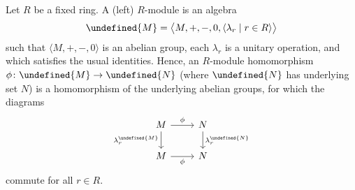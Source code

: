 \documentclass[article, a4paper, 11pt, oneside]{memoir}
\let\mathfrak\undefined
\numberwithin{equation}{chapter}
\theoremstyle{nonumberplain}
\begin{document}
\begin{remarkbreak}
    Let $R$ be a fixed ring. A (left) $R$-module is an algebra
    \begin{equation*}
        \mathfrak{M} = \bigl\langle M, +, -, 0, \langle \lambda_r \mid r \in R \rangle \bigr\rangle
    \end{equation*}
    such that $\langle M, +, -, 0 \rangle$ is an abelian group, each $\lambda_r$ is a unitary operation, and which satisfies the usual identities. Hence, an $R$-module homomorphism $\phi \colon \mathfrak{M} \to \mathfrak{N}$ (where $\mathfrak{N}$ has underlying set $N$) is a homomorphism of the underlying abelian groups, for which the diagrams
    \begin{equation*}
        \begin{tikzcd}
            M
                \ar[r, "\phi"]
                \ar[d, "\lambda_r^{\mathfrak{M}}", swap]
            & N
                \ar[d, "\lambda_r^{\mathfrak{N}}"]
            \\
            M
                \ar[r, "\phi", swap]
            & N
        \end{tikzcd}
    \end{equation*}
    commute for all $r \in R$.
\end{remarkbreak}
\end{document}
